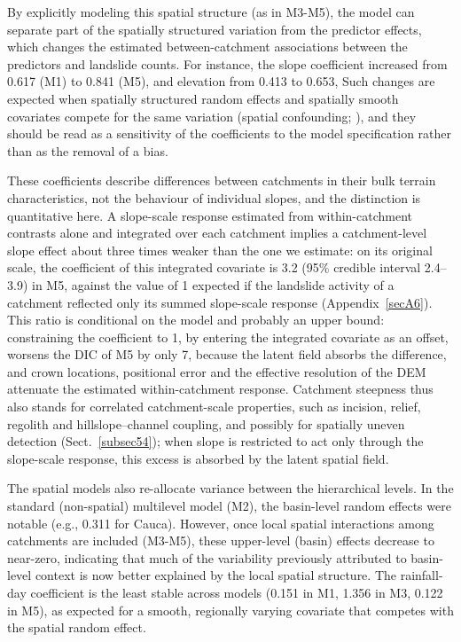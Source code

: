 \documentclass[journal abbreviation, manuscript]{copernicus}
\newcommand{\hl}[1]{#1}
\newcommand{\hlE}[1]{#1}
\begin{document}
By explicitly modeling this spatial structure (as in M3-M5), the model can \hlE{separate part of the spatially structured variation from the predictor effects, which changes the estimated between-catchment associations between the predictors and landslide counts}. 
For instance, the slope coefficient increased from 0.617 (M1) to \hlE{0.841} (M5), and elevation from \hl{0.413 to} \hlE{0.653}, \hlE{Such changes are expected when spatially structured random effects and spatially smooth covariates compete for the same variation (spatial confounding; }\citealp{hodges2010adding}\hlE{), and they should be read as a sensitivity of the coefficients to the model specification rather than as the removal of a bias.}

\hlE{These coefficients describe differences between catchments in their bulk terrain characteristics, not the behaviour of individual slopes, and the distinction is quantitative here. A slope-scale response estimated from within-catchment contrasts alone and integrated over each catchment implies a catchment-level slope effect about three times weaker than the one we estimate: on its original scale, the coefficient of this integrated covariate is 3.2 (95\% credible interval 2.4--3.9) in M5, against the value of 1 expected if the landslide activity of a catchment reflected only its summed slope-scale response (\mbox{Appendix~\ref{secA6}}). This ratio is conditional on the model and probably an upper bound: constraining the coefficient to 1, by entering the integrated covariate as an offset, worsens the DIC of M5 by only 7, because the latent field absorbs the difference, and crown locations, positional error and the effective resolution of the DEM attenuate the estimated within-catchment response. Catchment steepness thus also stands for correlated catchment-scale properties, such as incision, relief, regolith and hillslope--channel coupling, and possibly for spatially uneven detection (\mbox{Sect.~\ref{subsec54}}); when slope is restricted to act only through the slope-scale response, this excess is absorbed by the latent spatial field.}

The spatial models also re-allocate variance between the hierarchical levels. 
In the standard (non-spatial) multilevel model (M2), the basin-level random effects were notable (e.g., 0.311 for Cauca). 
However, once local spatial interactions among catchments are included (M3-M5), these upper-level (basin) effects decrease to near-zero, indicating that much of the variability previously attributed to basin-level context is now better explained by the local spatial structure. 
\hlE{The rainfall-day coefficient is the least stable across models (0.151 in M1, 1.356 in M3, 0.122 in M5), as expected for a smooth, regionally varying covariate that competes with the spatial random effect.}
\end{document}
